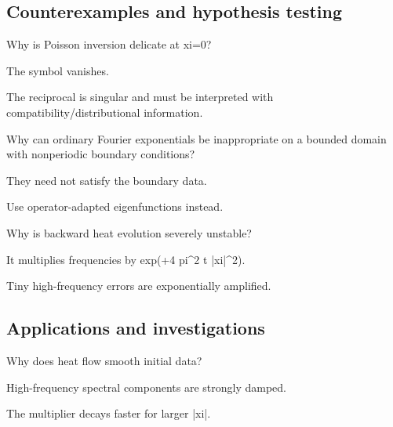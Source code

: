 \subsection*{Counterexamples and hypothesis testing}

\begin{exercise}\label{exr:iii28-expand-10}
Why is Poisson inversion delicate at xi=0?
\end{exercise}
\begin{hint}
The symbol vanishes.
\end{hint}
\begin{solution}
The reciprocal is singular and must be interpreted with compatibility/distributional information.
\end{solution}

\begin{exercise}\label{exr:iii28-expand-11}
Why can ordinary Fourier exponentials be inappropriate on a bounded domain with nonperiodic boundary conditions?
\end{exercise}
\begin{hint}
They need not satisfy the boundary data.
\end{hint}
\begin{solution}
Use operator-adapted eigenfunctions instead.
\end{solution}

\begin{exercise}\label{exr:iii28-expand-12}
Why is backward heat evolution severely unstable?
\end{exercise}
\begin{hint}
It multiplies frequencies by exp(+4 pi\textasciicircum{}2 t |xi|\textasciicircum{}2).
\end{hint}
\begin{solution}
Tiny high-frequency errors are exponentially amplified.
\end{solution}

\subsection*{Applications and investigations}

\begin{exercise}\label{exr:iii28-expand-13}
Why does heat flow smooth initial data?
\end{exercise}
\begin{hint}
High-frequency spectral components are strongly damped.
\end{hint}
\begin{solution}
The multiplier decays faster for larger |xi|.
\end{solution}

